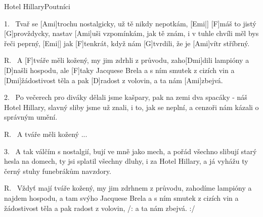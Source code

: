 \begin{song}{Hotel Hillary}{Poutníci}

\begin{xverse}{1.~}
Tvař se [\large Ami]trochu nostalgicky, už tě nikdy nepotkám, [\large Emi|]{}
[\large F]máš to jistý [\large G]provždycky, nastav [\large Ami]uši vzpomínkám,
jak tě znám, i v tuhle chvíli měl bys řeči peprný, [\large Emi|]{}
jak [\large F]tenkrát, když nám [\large G]tvrdili, že je [\large Ami]vítr stříbrný.
\end{xverse}

\begin{xverse}{R.~}
A [\large F]tváře měli kožený, my jim zdrhli z průvodu,
zaho[\large Dmi]dili lampióny a [\large D]našli hospodu,
ale [\large F]taky Jacquese Brela a s ním smutek z cizích vin
a [\large Dmi]{žádo}stivost těla a pak [\large D]radost z volovin,
a ta nám [\large Ami]zbejvá.
\end{xverse}

\begin{xverse}{2.~}
Po večerech pro diváky dělali jsme kašpary,
pak na zemi dva spacáky - náš Hotel Hillary,
slavný sliby jsme už znali, i to, jak se neplní,
a cenzoři nám kázali o správným umění.
\end{xverse}


\begin{xverse}{R.~}
A tváře měli kožený ...
\end{xverse}


\begin{xverse}{3.~}
A tak válčím s nostalgií, bují ve mně jako mech,
a pořád všechno slibují starý hesla na domech,
ty jsi splatil všechny dluhy, i za Hotel Hillary,
a já vyhážu ty černý stuhy funebrákům navzdory.
\end{xverse}


\begin{xverse}{R.~}
Vždyť mají tváře kožený, my jim zdrhnem z průvodu,
zahodíme lampióny a najdem hospodu,
a tam svýho Jacquese Brela a s ním smutek z cizích vin
a žádostivost těla a pak radost z volovin,
/: a ta nám zbejvá. :/
\end{xverse}
\end{song}


